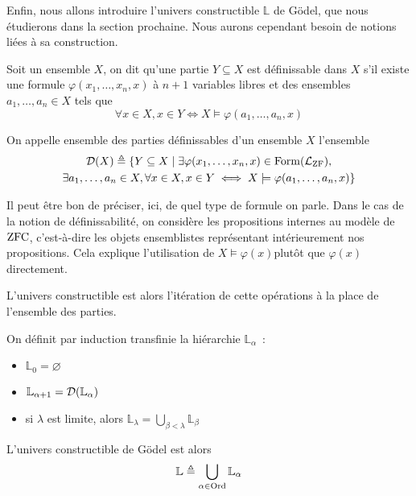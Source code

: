Enfin, nous allons introduire l'univers constructible $\mathbb L$ de Gödel, que
nous étudierons dans la section prochaine. Nous aurons cependant besoin de
notions liées à sa construction.

\begin{definition}
  Soit un ensemble $X$, on dit qu'une partie $Y\subseteq X$ est définissable
  dans $X$ s'il existe une formule $\varphi(x_1,\ldots,x_n,x)$ à $n+1$ variables
  libres et des ensembles $a_1,\ldots,a_n \in X$ tels que
  \[\forall x \in X, x \in Y \iff X\models \varphi(a_1,\ldots,a_n,x)\]

  On appelle ensemble des parties définissables d'un ensemble $X$ l'ensemble
  \begin{multline*}
    \mathcal{D}(X) \triangleq \{Y \subseteq X \mid \exists
    \varphi(x_1,\ldots,x_n,x)\in\operatorname{Form}(\mathcal L_{\operatorname{ZF}}),\\
    \exists a_1,\ldots,a_n \in X,
    \forall x \in X, x \in Y \iff X \models \varphi(a_1,\ldots,a_n,x)\}
  \end{multline*}
\end{definition}

\begin{remark}
  Il peut être bon de préciser, ici, de quel type de formule on parle. Dans le
  cas de la notion de définissabilité, on considère les propositions internes
  au modèle de $\operatorname{ZFC}$, c'est-à-dire les objets ensemblistes représentant
  intérieurement nos propositions. Cela explique l'utilisation de
  \og $X\models \varphi(x)$\fg plutôt que \og$\varphi(x)$\fg directement.
\end{remark}

L'univers constructible est alors l'itération de cette opérations à la place de
l'ensemble des parties.

\begin{definition}
  On définit par induction transfinie la hiérarchie $\mathbb L_\alpha$~:
  \begin{itemize}
  \item $\mathbb L_0 = \varnothing$
  \item $\mathbb L_{\alpha + 1} = \mathcal{D} (\mathbb L_\alpha)$
  \item si $\lambda$ est limite, alors
    $\displaystyle\mathbb L_\lambda = \bigcup_{\beta < \lambda} \mathbb L_\beta$
  \end{itemize}
  L'univers constructible de Gödel est alors
  \[\mathbb L \triangleq \bigcup_{\alpha \in \operatorname{Ord}} \mathbb L_\alpha\]
\end{definition}

